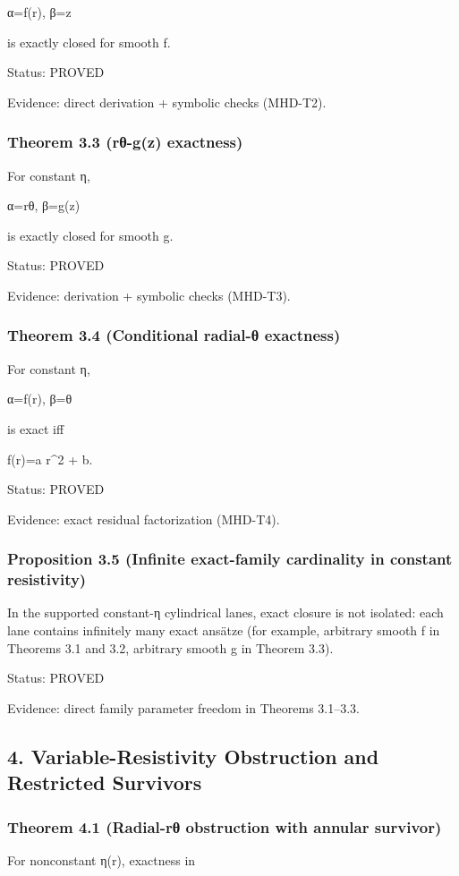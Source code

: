 \documentclass[11pt]{article}
\begin{document}
α=f(r), β=z

is exactly closed for smooth f.


Status: PROVED

Evidence: direct derivation + symbolic checks (MHD-T2).


\subsubsection*{Theorem 3.3 (rθ-g(z) exactness)}
For constant η,

α=rθ, β=g(z)

is exactly closed for smooth g.


Status: PROVED

Evidence: derivation + symbolic checks (MHD-T3).


\subsubsection*{Theorem 3.4 (Conditional radial-θ exactness)}
For constant η,

α=f(r), β=θ

is exact iff

f(r)=a r\textasciicircum{}2 + b.


Status: PROVED

Evidence: exact residual factorization (MHD-T4).


\subsubsection*{Proposition 3.5 (Infinite exact-family cardinality in constant resistivity)}
In the supported constant-η cylindrical lanes, exact closure is not isolated: each lane contains infinitely many exact ansätze (for example, arbitrary smooth f in Theorems 3.1 and 3.2, arbitrary smooth g in Theorem 3.3).


Status: PROVED

Evidence: direct family parameter freedom in Theorems 3.1–3.3.


\subsection*{4. Variable-Resistivity Obstruction and Restricted Survivors}

\subsubsection*{Theorem 4.1 (Radial-rθ obstruction with annular survivor)}
For nonconstant η(r), exactness in
\end{document}
